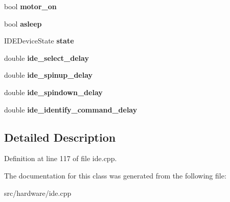 \begin{DoxyCompactItemize}
\item 
\hypertarget{classIDEDevice_a89769c3383a7fc337a9c90f74d68b3d9}{bool {\bfseries motor\-\_\-on}}\label{classIDEDevice_a89769c3383a7fc337a9c90f74d68b3d9}

\item 
\hypertarget{classIDEDevice_a426ded1b443ad557e17936a460672383}{bool {\bfseries asleep}}\label{classIDEDevice_a426ded1b443ad557e17936a460672383}

\item 
\hypertarget{classIDEDevice_a36a20a48ec09fbbb26444ee4af9113b8}{I\-D\-E\-Device\-State {\bfseries state}}\label{classIDEDevice_a36a20a48ec09fbbb26444ee4af9113b8}

\item 
\hypertarget{classIDEDevice_aae577afca50523abdbf8aacc7317335d}{double {\bfseries ide\-\_\-select\-\_\-delay}}\label{classIDEDevice_aae577afca50523abdbf8aacc7317335d}

\item 
\hypertarget{classIDEDevice_aca59bb2197b37cf31821ca98e6cd1ed8}{double {\bfseries ide\-\_\-spinup\-\_\-delay}}\label{classIDEDevice_aca59bb2197b37cf31821ca98e6cd1ed8}

\item 
\hypertarget{classIDEDevice_ac1d7d6ca00bff8d765f0db43ad26297b}{double {\bfseries ide\-\_\-spindown\-\_\-delay}}\label{classIDEDevice_ac1d7d6ca00bff8d765f0db43ad26297b}

\item 
\hypertarget{classIDEDevice_aadf3fd25ff624d301e8a0ed6b92fc2c7}{double {\bfseries ide\-\_\-identify\-\_\-command\-\_\-delay}}\label{classIDEDevice_aadf3fd25ff624d301e8a0ed6b92fc2c7}

\end{DoxyCompactItemize}


\subsection{Detailed Description}


Definition at line 117 of file ide.\-cpp.



The documentation for this class was generated from the following file\-:\begin{DoxyCompactItemize}
\item 
src/hardware/ide.\-cpp\end{DoxyCompactItemize}
